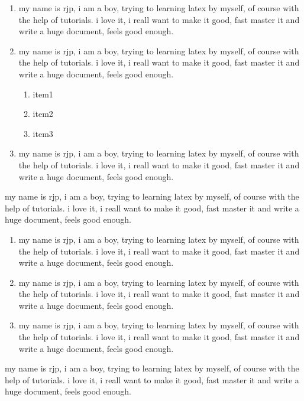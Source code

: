 \documentclass[a4paper, UTF8]{article}
\begin{document}
\begin{enumerate}
    \item my name is rjp, i am a boy, trying to learning latex by myself, of course with the help of tutorials. i love it, i reall want to make it good, fast master it and write a huge document, feels good enough.
    \item my name is rjp, i am a boy, trying to learning latex by myself, of course with the help of tutorials. i love it, i reall want to make it good, fast master it and write a huge document, feels good enough.
        \begin{enumerate}
            \item item1
            \item item2
            \item item3  
        \end{enumerate}
    \item my name is rjp, i am a boy, trying to learning latex by myself, of course with the help of tutorials. i love it, i reall want to make it good, fast master it and write a huge document, feels good enough.
\end{enumerate}

my name is rjp, i am a boy, trying to learning latex by myself, of course with the help of tutorials. i love it, i reall want to make it good, fast master it and write a huge document, feels good enough.

\begin{enumerate}[A1]
    \item my name is rjp, i am a boy, trying to learning latex by myself, of course with the help of tutorials. i love it, i reall want to make it good, fast master it and write a huge document, feels good enough.
    \item my name is rjp, i am a boy, trying to learning latex by myself, of course with the help of tutorials. i love it, i reall want to make it good, fast master it and write a huge document, feels good enough.
    \item my name is rjp, i am a boy, trying to learning latex by myself, of course with the help of tutorials. i love it, i reall want to make it good, fast master it and write a huge document, feels good enough.
\end{enumerate}

my name is rjp, i am a boy, trying to learning latex by myself, of course with the help of tutorials. i love it, i reall want to make it good, fast master it and write a huge document, feels good enough.
\end{document}
